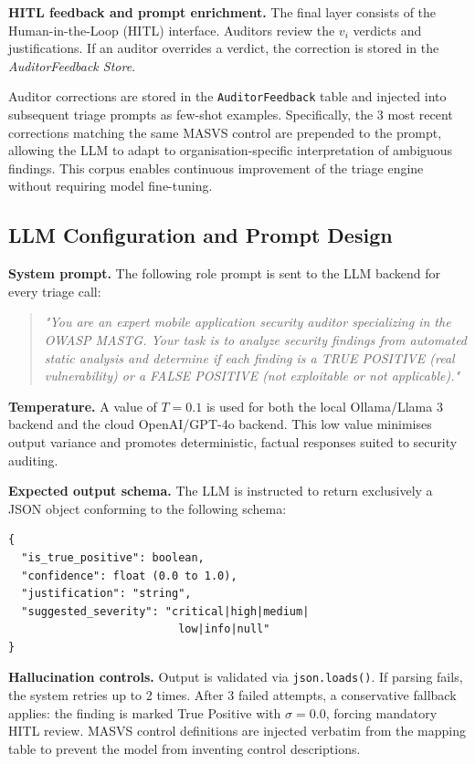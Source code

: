 \documentclass[preprint,12pt,a4paper]{elsarticle}
\begin{document}
\textbf{HITL feedback and prompt enrichment.} The final layer consists of the 
Human-in-the-Loop (HITL) interface. Auditors review the $v_i$ verdicts and 
justifications. If an auditor overrides a verdict, the correction is stored in 
the \textit{AuditorFeedback Store}. 

Auditor corrections are stored in the \texttt{AuditorFeedback} table and injected into subsequent triage prompts as few-shot examples. Specifically, the 3 most recent corrections matching the same MASVS control are prepended to the prompt, allowing the LLM to adapt to organisation-specific interpretation of ambiguous findings. This corpus enables continuous improvement of the triage engine without requiring model fine-tuning.

\subsection*{LLM Configuration and Prompt Design}

\textbf{System prompt.} The following role prompt 
is sent to the LLM backend for every triage call:

\begin{quote}
\textit{"You are an expert mobile application 
security auditor specializing in the OWASP MASTG. 
Your task is to analyze security findings from 
automated static analysis and determine if each 
finding is a TRUE POSITIVE (real vulnerability) 
or a FALSE POSITIVE (not exploitable or not 
applicable)."}
\end{quote}

\textbf{Temperature.} A value of $T = 0.1$ is 
used for both the local Ollama/Llama 3 backend 
and the cloud OpenAI/GPT-4o backend. This low 
value minimises output variance and promotes 
deterministic, factual responses suited to 
security auditing.

\textbf{Expected output schema.} The LLM is 
instructed to return exclusively a JSON object 
conforming to the following schema:

\begin{verbatim}
{
  "is_true_positive": boolean,
  "confidence": float (0.0 to 1.0),
  "justification": "string",
  "suggested_severity": "critical|high|medium|
                          low|info|null"
}
\end{verbatim}

\textbf{Hallucination controls.} Output is 
validated via \texttt{json.loads()}. If parsing 
fails, the system retries up to 2 times. After 
3 failed attempts, a conservative fallback 
applies: the finding is marked True Positive 
with $\sigma = 0.0$, forcing mandatory HITL 
review. MASVS control definitions are injected 
verbatim from the mapping table to prevent the 
model from inventing control descriptions.
\end{document}
